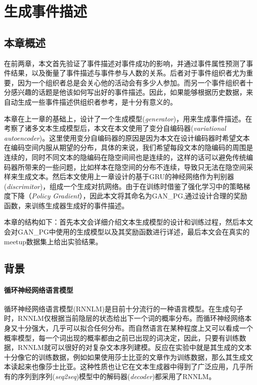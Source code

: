 % 
\section{生成事件描述}

\subsection{本章概述}
在前两章，本文首先验证了事件描述对事件成功的影响，并通过事件属性预测了事件结果，以及衡量了事件描述与事件参与人数的关系。后者对于事件组织者尤为重要，因为一个组织者总是会关心他的活动会有多少人参加。而另一个事件组织者十分感兴趣的话题是他该如何写出好的事件描述。因此，如果能够根据历史数据，来自动生成一些事件描述供组织者参考，是十分有意义的。

本章在上一章的基础上，设计了一个生成模型(\textit{generator})，用来生成事件描述。在考察了诸多文本生成模型后，本文在本文使用了变分自编码器\cite{kingma_auto-encoding_2013,bowman_generating_2015}(\textit{variational autoencoder})。这里使用变分自编码器的原因是因为本文在设计编码器时希望文本在编码空间内服从期望的分布，具体的来说，我们希望每段文本的隐编码的周围是连续的，同时不同文本的隐编码在隐空间间也是连续的，这样的话可以避免传统编码器所带来的一些问题，比如样本在隐空间的分布不连续，导致只无法在隐空间采样来生成文本。然后本文使用上一章设计的基于GRU的神经网络作为判别器(\textit{discrimitor})，组成一个生成对抗网络\cite{goodfellow_generative_2014}。由于在训练时借鉴了强化学习中的策略梯度下降（\textit{Policy Gradient}），因此本文将其命名为GAN\_PG,通过设计合理的奖励函数，来训练生成器生成好的事件描述。

本章的结构如下：首先本文会详细介绍文本生成模型的设计和训练过程，然后本文会对GAN\_PG中使用的生成模型以及其奖励函数进行详述，最后本文会在真实的meetup数据集上给出实验结果。

\subsection{背景}
\paragraph{循环神经网络语言模型}
循环神经网络语言模型(RNNLM\cite{mikolov_rnnlm_2011})是目前十分流行的一种语言模型。在生成句子时，RNNLM仅根据当前隐层的状态给出下一个词的概率分布。而循环神经网络本身又十分强大，几乎可以拟合任何分布。而自然语言在某种程度上又可以看成一个概率模型，每一个词出现的概率都由之前已出现的词决定，因此，只要有训练数据，RNNLM就可以很好的对复杂文本序列建模。反应在实验中就是其生成的文本十分像它的训练数据，例如如果使用莎士比亚的文章作为训练数据，那么其生成文本读起来也像莎士比亚。这种性质也让它在文本生成器中得到了广泛应用，几乎所有的序列到序列(\textit{seq2seq})模型中的解码器(\textit{decoder})都采用了RNNLM。
